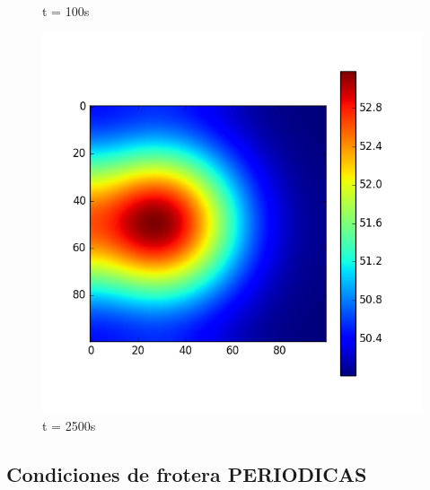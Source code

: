 \documentclass{article}
\begin{document}
\begin{figure}[H]
  \caption{t = 100s}\label{fig:awesome_image2}
\endminipage\hfill
{}%
  \includegraphics[width=\linewidth]{abiertasNOCte2500.png}
  \caption{t = 2500s}\label{fig:awesome_image3}
\endminipage
\end{figure}



\subsection{Condiciones de frotera PERIODICAS}
\end{document}
